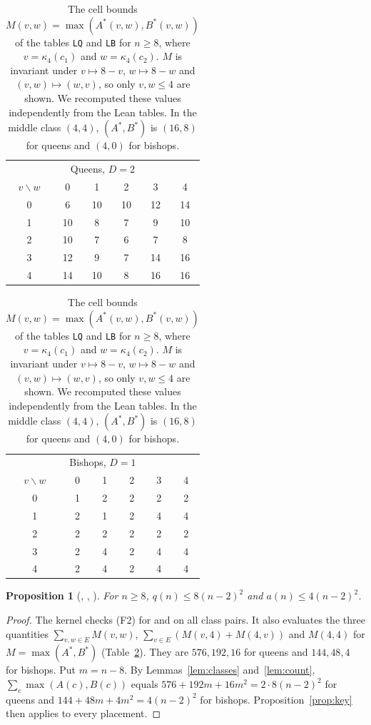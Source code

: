 \documentclass[11pt]{amsart}
\theoremstyle{plain}
\newtheorem{proposition}[theorem]{Proposition}
\theoremstyle{definition}
\begin{document}
\begin{table}[tb]
\centering\footnotesize
\setlength{\tabcolsep}{4pt}
\begin{tabular}{c|ccccc}
\multicolumn{6}{c}{Queens, $D=2$}\\
$v\backslash w$&0&1&2&3&4\\\hline
0&6&10&10&12&14\\
1&10&8&7&9&10\\
2&10&7&6&7&8\\
3&12&9&7&14&16\\
4&14&10&8&16&16
\end{tabular}
\qquad\qquad
\begin{tabular}{c|ccccc}
\multicolumn{6}{c}{Bishops, $D=1$}\\
$v\backslash w$&0&1&2&3&4\\\hline
0&1&2&2&2&2\\
1&2&1&2&4&4\\
2&2&2&2&2&2\\
3&2&4&2&4&4\\
4&2&4&2&4&4
\end{tabular}
\caption{The cell bounds $M(v,w)=\max(A^*(v,w),B^*(v,w))$ of the tables \texttt{LQ} and \texttt{LB} for $n\ge8$, where $v=\kappa_4(c_1)$ and $w=\kappa_4(c_2)$. $M$ is invariant under $v\mapsto8-v$, $w\mapsto8-w$ and $(v,w)\mapsto(w,v)$, so only $v,w\le4$ are shown. We recomputed these values independently from the Lean tables. In the middle class $(4,4)$, $(A^*,B^*)$ is $(16,8)$ for queens and $(4,0)$ for bishops.}
\label{tab:classes}
\end{table}

\begin{proposition}[, , ]\label{prop:large}
For $n\ge8$, $q(n)\le8(n-2)^2$ and $a(n)\le4(n-2)^2$.
\end{proposition}
\begin{proof}
The kernel checks (F2) for  and  on all class pairs. It also evaluates the three quantities $\sum_{v,w\in E}M(v,w)$, $\sum_{v\in E}(M(v,4)+M(4,v))$ and $M(4,4)$ for $M=\max(A^*,B^*)$ (Table~\ref{tab:classes}). They are $576,192,16$ for queens and $144,48,4$ for bishops. Put $m=n-8$. By Lemmas~\ref{lem:classes} and~\ref{lem:count}, $\sum_c\max(A(c),B(c))$ equals $576+192m+16m^2=2\cdot8(n-2)^2$ for queens and $144+48m+4m^2=4(n-2)^2$ for bishops. Proposition~\ref{prop:key} then applies to every placement.
\end{proof}
\end{document}
